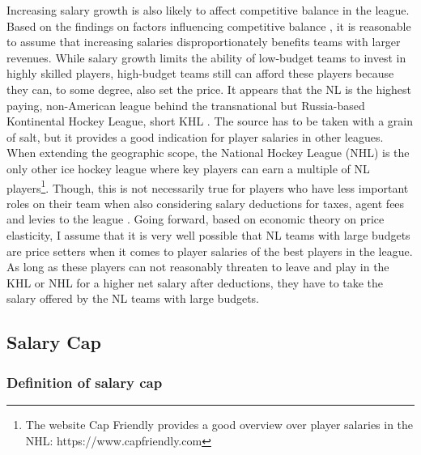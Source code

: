 \documentclass[12pt, a4paper]{article}
\begin{document}
\noindent
Increasing salary growth is also likely to affect competitive balance in the league. Based on the findings on factors influencing competitive balance \citep[see][]{sanderson_many_2002, pawlowski_top_2010}, it is reasonable to assume that increasing salaries disproportionately benefits teams with larger revenues. While salary growth limits the ability of low-budget teams to invest in highly skilled players, high-budget teams still can afford these players because they can, to some degree, also set the price. It appears that the NL is the highest paying, non-American league behind the transnational but Russia-based Kontinental Hockey League, short KHL \citep{darryl_wolski_2112hockey_2020_2020}. The source has to be taken with a grain of salt, but it provides a good indication for player salaries in other leagues. When extending the geographic scope, the National Hockey League (NHL) is the only other ice hockey league where key players can earn a multiple of NL players\footnote{The website Cap Friendly provides a good overview over player salaries in the NHL: https://www.capfriendly.com}. Though, this is not necessarily true for players who have less important roles on their team when also considering salary deductions for taxes, agent fees and levies to the league \cite[see][]{noauthor_nhl_2016}. Going forward, based on economic theory on price elasticity, I assume that it is very well possible that NL teams with large budgets are price setters when it comes to player salaries of the best players in the league. As long as these players can not reasonably threaten to leave and play in the KHL or NHL for a higher net salary after deductions, they have to take the salary offered by the NL teams with large budgets.

\subsection{Salary Cap}

\subsubsection{Definition of salary cap}
\end{document}
